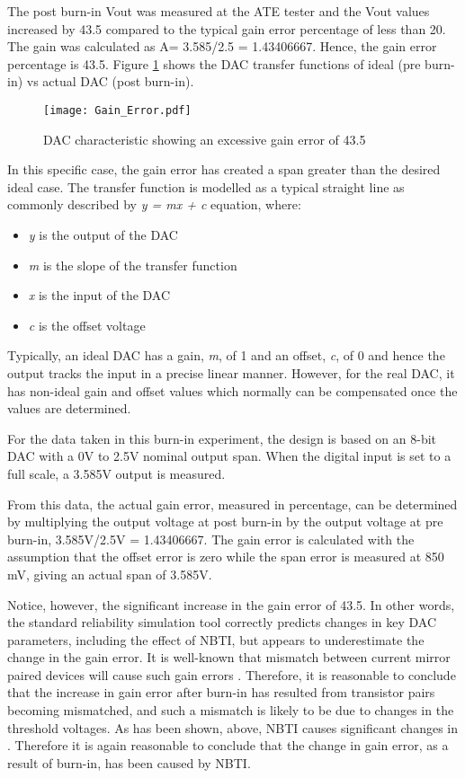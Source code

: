 \documentclass[11pt,a4paper]{article}
\begin{document}
The post burn-in Vout was measured at the ATE tester and the Vout values increased by 43.5 compared to the typical gain error percentage of less than 20. The gain was calculated as A= 3.585/2.5 = 1.43406667. Hence, the gain error percentage is 43.5.
Figure \ref{figure66} shows the DAC transfer functions of ideal (pre burn-in) vs actual DAC (post burn-in). 

\begin{figure}[t]
\centering
\texttt{[image: Gain\_Error.pdf]}
\caption{DAC characteristic showing an excessive gain error of 43.5}
\label{figure66}
\end{figure}

In this specific case, the gain error has created a span greater than the desired ideal case. The transfer function is modelled as a typical straight line as commonly described by \textit{y = mx + c} equation, where:

\begin{itemize}
\item \textit{y} is the output of the DAC

\item  \textit{m} is the slope of the transfer function

\item  \textit{x} is the input of the DAC

\item  \textit{c} is the offset voltage
\end{itemize}

Typically, an ideal DAC has a gain, \textit{m}, of 1 and an offset, \textit{c}, of 0 and hence the output tracks the input in a precise linear manner. However, for the real DAC, it has non-ideal gain and offset values which normally can be compensated once the values are determined.

For the data taken in this burn-in experiment, the design is based on an 8-bit DAC with a 0V to 2.5V nominal output span. When the digital input is set to a full scale, a 3.585V output is measured.

From this data, the actual gain error, measured in percentage, can be determined by multiplying the output voltage at post burn-in by the output voltage at pre burn-in, 3.585V/2.5V = 1.43406667. The gain error is calculated with the assumption that the offset error is zero while the span error is measured at 850 mV, giving an actual span of 3.585V.

Notice, however, the significant increase in the gain error of 43.5. In other words, the standard reliability simulation tool correctly predicts changes in key DAC parameters, including the effect of NBTI, but appears to underestimate the change in the gain error. It is well-known that mismatch between current mirror paired devices will cause such gain errors \cite{Agostinelli}. Therefore, it is reasonable to conclude that the increase in gain error after burn-in has resulted from transistor pairs becoming mismatched, and such a mismatch is likely to be due to changes in the threshold voltages. As has been shown, above, NBTI causes significant changes in . Therefore it is again reasonable to conclude that the change in gain error, as a result of burn-in, has been caused by NBTI.
\end{document}
